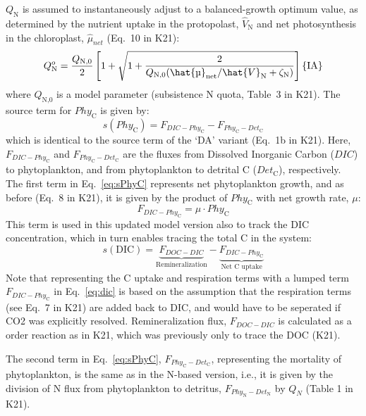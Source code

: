 \documentclass[gmd, manuscript]{copernicus}
\begin{document}
$Q_\text{N}$ is assumed to instantaneously adjust to a balanced-growth optimum value, as determined by the nutrient uptake in the protopolast, $\hat{V}_\text{N}$ and net photosynthesis in the chloroplast, $\hat{\mu}_{net}$ (Eq.~10 in K21):
\begin{equation}\label{eq:Qopt}
 Q_\text{N}^o= \frac{Q_\text{N,0}}{2} \left[1+\sqrt{1+\frac{2}{Q_\text{N,0}{({\hat{\mu}_{\text{net}}}/{\hat{V}_\text{N}}+\zeta_\text{N} )}}} \right] \hfill \{\text{IA}\}
\end{equation}
where $Q_\text{N,0}$ is a model parameter (subsistence N quota, Table~3 in K21). The source term for $Phy_\text{C}$ is given by:
\begin{equation} \label{eq:sPhyC}
s(Phy_{\text{C}}) = F_{DIC-Phy_\text{C}} - F_{Phy_{\text{C}}-Det_{\text{C}}}
\end{equation}
which is identical to the source term of the `DA' variant (Eq.~1b in K21). Here, $F_{DIC-Phy_\text{C}}$ and $F_{Phy_{\text{C}}-Det_{\text{C}}}$ are the fluxes from Dissolved Inorganic Carbon ($DIC$) to phytoplankton, and from phytoplankton to detrital C ($Det_\text{C}$), respectively. The first term in Eq.~\ref{eq:sPhyC} represents net phytoplankton growth, and as before (Eq.~8 in K21), it is given by the product of $Phy_\text{C}$ with net growth rate, $\mu$: 
\begin{equation} \label{eq:fdicphyc}
 F_{DIC-Phy_\text{C}} = \mu \cdot Phy_\text{C}
\end{equation}
This term is used in this updated model version also to track the DIC concentration, which in turn enables tracing the total C in the system:
\begin{equation} \label{eq:dic}
  s(\text{DIC}) = \underbrace{F_{DOC-DIC}}_\textrm{Remineralization} - \underbrace{F_{DIC-Phy_{\text{C}}}}_\textrm{Net C uptake}
\end{equation}
Note that representing the C uptake and respiration terms with a lumped term $F_{DIC-Phy_{\text{C}}}$ in Eq.~\ref{eq:dic} is based on the assumption that the respiration terms (see Eq.~7 in K21) are added back to DIC, and would have to be seperated if CO2 was explicitly resolved. Remineralization flux, $F_{DOC-DIC}$ is calculated as a order reaction as in K21, which was previously only to trace the DOC (K21).

The second term in Eq.~\ref{eq:sPhyC}, $F_{Phy_\text{C}-Det_\text{C}}$, representing the mortality of phytoplankton, is the same as in the N-based version, i.e., it is given by the division of N flux from phytoplankton to detritus, $F_{Phy_\text{N}-Det_\text{N}}$ by $Q_N$ (Table 1 in K21).
\end{document}
